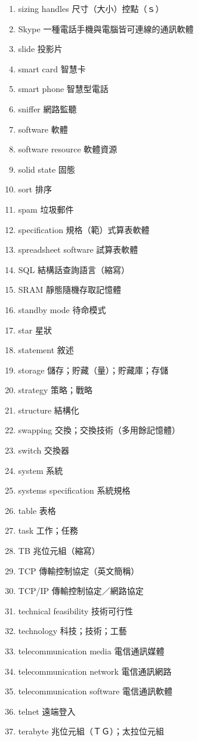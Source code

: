 \begin{enumerate}
  \item sizing handles 尺寸（大小）控點（ｓ）
  \item Skype 一種電話手機與電腦皆可連線的通訊軟體
  \item slide 投影片
  \item smart card 智慧卡
  \item smart phone 智慧型電話
  \item sniffer 網路監聽
  \item software 軟體
  \item software resource 軟體資源
  \item solid state 固態
  \item sort 排序
  \item spam 垃圾郵件
  \item specification 規格（範）式算表軟體
  \item spreadsheet software 試算表軟體
  \item SQL 結構話查詢語言（縮寫）
  \item SRAM 靜態隨機存取記憶體
  \item standby mode 待命模式
  \item star 星狀
  \item statement 敘述
  \item storage 儲存；貯藏（量）；貯藏庫；存儲
  \item strategy 策略；戰略
  \item structure 結構化
  \item swapping 交換；交換技術（多用餘記憶體）
  \item switch 交換器
  \item system 系統
  \item systems specification 系統規格
  \item table 表格
  \item task 工作；任務
  \item TB 兆位元組（縮寫）
  \item TCP 傳輸控制協定（英文簡稱）
  \item TCP/IP 傳輸控制協定／網路協定
  \item technical feasibility 技術可行性
  \item technology 科技；技術；工藝
  \item telecommunication media 電信通訊媒體
  \item telecommunication network 電信通訊網路
  \item telecommunication software 電信通訊軟體
  \item telnet 遠端登入
  \item terabyte 兆位元組（ＴＧ）；太拉位元組

\end{enumerate}
